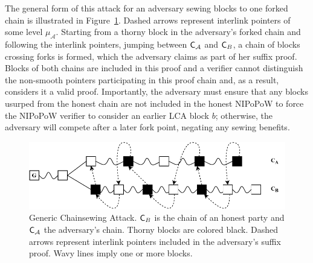 The general form of this attack for an adversary sewing blocks to one forked chain is illustrated in Figure~\ref{fig:generic_attack}. Dashed arrows represent interlink pointers of some level $\mu_\mathcal{A}$. Starting from a thorny block in the adversary's forked chain and following the interlink pointers, jumping between $\mathsf{C}_\mathcal{A}$ and $\mathsf{C}_B$, a chain of blocks crossing forks is formed, which the adversary claims as part of her suffix proof. Blocks of both chains are included in this proof and a verifier cannot distinguish the non-smooth pointers participating in this proof chain and, as a result, considers it a valid proof. Importantly, the adversary must ensure that any blocks usurped from the honest chain are not included in the honest NIPoPoW to force the NIPoPoW verifier to consider an earlier LCA block $b$; otherwise, the adversary will compete after a later fork point, negating any sewing benefits.

\begin{figure}[h]
	\begin{center}
		\includegraphics[width=0.9\columnwidth
		]{figures/generic_chainsewing_attack.pdf}
	\end{center}
	\caption{Generic Chainsewing Attack. $\mathsf{C}_B$ is the chain of an honest party and $\mathsf{C}_\mathcal{A}$ the adversary's chain. Thorny blocks are colored black. Dashed arrows represent interlink pointers included in the	adversary's suffix proof. Wavy lines imply one or more blocks.}
	\label{fig:generic_attack}
\end{figure}

